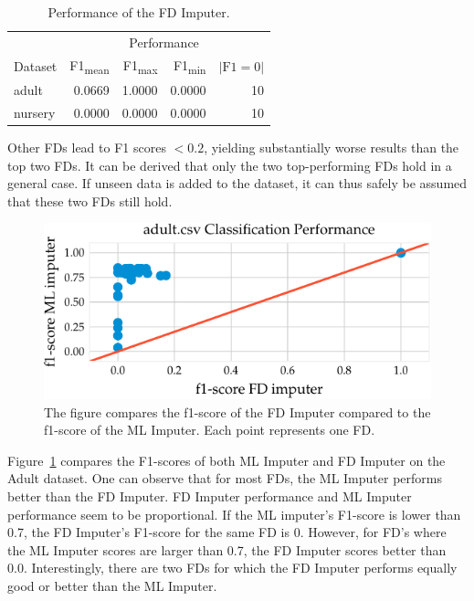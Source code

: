 \begin{table}[ht]
    \centering
    \begin{tabular}{lrrrr}
        \toprule
        & & \multicolumn{2}{c}{Performance} &  \\ \cmidrule(lr{.25em}){2-5}
        Dataset & F1\textsubscript{mean} & F1\textsubscript{max} & F1\textsubscript{min} & \(|\text{F1} = 0|\)\\
        \midrule
        adult & 0.0669 & 1.0000 & 0.0000 & 10 \\
        nursery & 0.0000 & 0.0000 & 0.0000 & 10 \\
        \bottomrule
    \end{tabular}
    \caption{Performance of the FD Imputer.}\label{tab:fd-imputer-performance}
\end{table}
Other FDs lead to F1 scores \(< 0.2\), yielding substantially worse results than the top two FDs.
It can be derived that only the two top-performing FDs hold in a general case.
If unseen data is added to the dataset, it can thus safely be assumed that these two FDs still hold.

\begin{figure}[h]
     \centering
     \includegraphics[width=.8\textwidth]{../figures/adult/f1_ml_fd_adult}
     \caption{The figure compares the f1-score of the FD Imputer compared to the f1-score of the ML Imputer. Each point represents one FD.}
     \label{fig:f1_ml_fd_adult}
 \end{figure}

Figure~\ref{fig:f1_ml_fd_adult} compares the F1-scores of both ML Imputer and FD Imputer on the Adult dataset.
One can observe that for most FDs, the ML Imputer performs better than the FD Imputer.
FD Imputer performance and ML Imputer performance seem to be proportional.
If the ML imputer's F1-score is lower than 0.7, the FD Imputer's F1-score for the same FD is 0.
However, for FD's where the ML Imputer scores are larger than 0.7, the FD Imputer scores better than 0.0.
Interestingly, there are two FDs for which the FD Imputer performs equally good or better than the ML Imputer.


